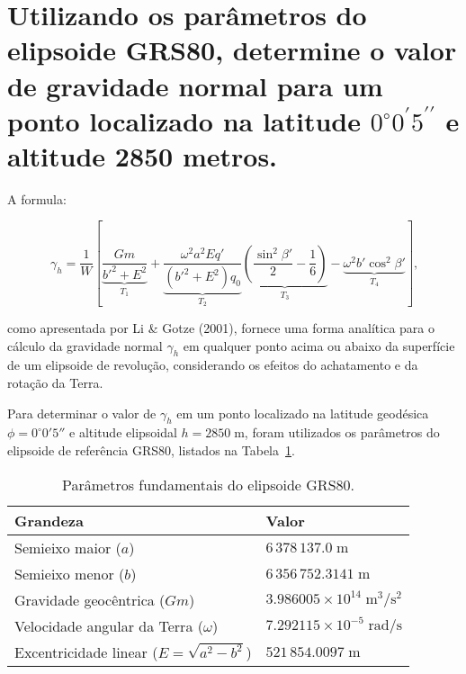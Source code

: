 
\section{Utilizando os parâmetros do elipsoide GRS80, determine o valor de gravidade normal para um ponto localizado na latitude \(0^\circ 0^\prime 5^{\prime\prime}\) e altitude 2850 metros.}

A formula:


\[
\gamma_h = 
\frac{1}{W}
\left[
\underbrace{
\frac{Gm}{b'^2 + E^2}
}_{T_1}
+
\underbrace{
\frac{\omega^2 a^2 E q'}{(b'^2 + E^2) q_0}
}_{T_2}
\underbrace{
\left( \frac{\sin^2 \beta'}{2} - \frac{1}{6} \right)
}_{T_3}
-
\underbrace{
\omega^2 b' \cos^2 \beta'
}_{T_4}
\right]
\text{,}
\]



\noindent
como apresentada por Li \& Gotze (2001), fornece uma forma analítica para o cálculo da gravidade normal \(\gamma_h\) em qualquer ponto acima ou abaixo da superfície de um elipsoide de revolução, considerando os efeitos do achatamento e da rotação da Terra.



Para determinar o valor de \(\gamma_h\) em um ponto localizado na latitude geodésica \(\phi = 0^\circ 0' 5''\) e altitude elipsoidal \(h = 2850\;\text{m}\), foram utilizados os parâmetros do elipsoide de referência GRS80, listados na Tabela~\ref{tab:grs80}.

\begin{table}[h]
\centering
\caption{Parâmetros fundamentais do elipsoide GRS80.}
\label{tab:grs80}
\begin{tabular}{ll}
\toprule
Grandeza & Valor \\
\midrule
Semieixo maior (\(a\)) & \(6\,378\,137.0\;\text{m}\) \\
Semieixo menor (\(b\)) & \(6\,356\,752.3141\;\text{m}\) \\
Gravidade geocêntrica (\(Gm\)) & \(3.986005 \times 10^{14}\;\text{m}^3/\text{s}^2\) \\
Velocidade angular da Terra (\(\omega\)) & \(7.292115 \times 10^{-5}\;\text{rad/s}\) \\
Excentricidade linear (\(E = \sqrt{a^2 - b^2}\)) & \(521\,854.0097\;\text{m}\) \\
\bottomrule
\end{tabular}
\end{table}

